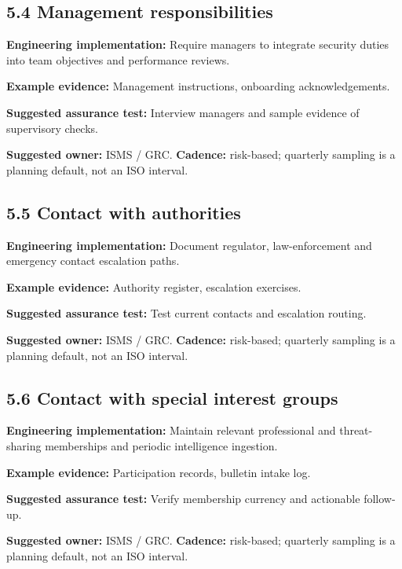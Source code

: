 \documentclass[11pt,letterpaper]{article}
\begin{document}
\subsection{5.4 Management responsibilities}
\textbf{Engineering implementation:} Require managers to integrate security duties into team objectives and performance reviews.\par
\textbf{Example evidence:} Management instructions, onboarding acknowledgements.\par
\textbf{Suggested assurance test:} Interview managers and sample evidence of supervisory checks.\par
\textbf{Suggested owner:} ISMS / GRC. \textbf{Cadence:} risk-based; quarterly sampling is a planning default, not an ISO interval.\par
{}
\subsection{5.5 Contact with authorities}
\textbf{Engineering implementation:} Document regulator, law-enforcement and emergency contact escalation paths.\par
\textbf{Example evidence:} Authority register, escalation exercises.\par
\textbf{Suggested assurance test:} Test current contacts and escalation routing.\par
\textbf{Suggested owner:} ISMS / GRC. \textbf{Cadence:} risk-based; quarterly sampling is a planning default, not an ISO interval.\par
{}
\subsection{5.6 Contact with special interest groups}
\textbf{Engineering implementation:} Maintain relevant professional and threat-sharing memberships and periodic intelligence ingestion.\par
\textbf{Example evidence:} Participation records, bulletin intake log.\par
\textbf{Suggested assurance test:} Verify membership currency and actionable follow-up.\par
\textbf{Suggested owner:} ISMS / GRC. \textbf{Cadence:} risk-based; quarterly sampling is a planning default, not an ISO interval.\par
{}
\end{document}
